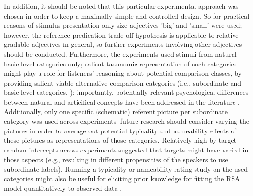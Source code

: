 In addition, it should be noted that this particular experimental approach was chosen in order to keep a maximally simple and controlled design. So for practical reasons of stimulus presentation only size-adjectives 'big' and 'small' were used; however, the reference-predication trade-off hypothesis is applicable to relative gradable adjectives in general, so further experiments involving other adjectives should be conducted. 
Furthermore, the experiments used stimuli from natural basic-level categories only; salient taxonomic representation of such categories might play a role for listeners' reasoning about potential comparison classes, by providing salient viable alternative comparison categories (i.e., subordinate and basic-level categories, \textcite[cf.][]{rosch1976, tenenbaum2011grow}); importantly, potentially relevant psychological differences between natural and articifical concepts have been addressed in the literature \parencite{kalish2002gold}. 
Additionally, only one specific (schematic) referent picture per subordinate category was used across experiments; future research should consider varying the pictures in order to average out potential typicality and nameability effects of these pictures as representations of those categories. Relatively high by-target random intercepts across experiments suggested that targets might have varied in those aspects (e.g., resulting in different propensities of the speakers to use subordinate labels). Running a typicality or nameability rating study on the used categories might also be useful for eliciting prior knowledge for fitting the RSA model quantitatively to observed data \parencite{franke2016does}. %

